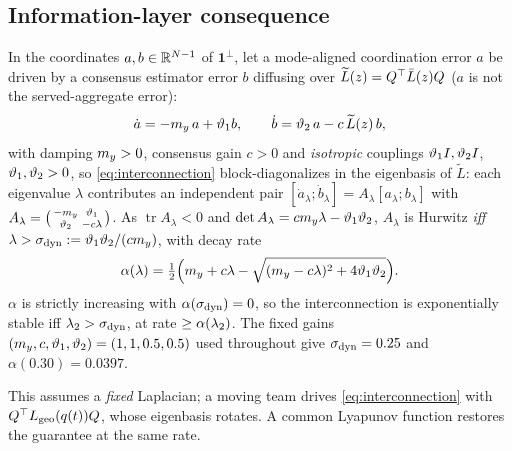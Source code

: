 \subsection{Information-layer consequence}
\begin{proposition}\label{thm:stability}
In the coordinates $a,b\in\mathbb{R}^{N-1}$ of $\mathbf1^{\perp}$, let a mode-aligned coordination
error $a$ be driven by a consensus estimator error $b$ diffusing over
$\widetilde L(z)=Q^{\top}\bar L(z)Q$ ($a$ is not the served-aggregate error):
\begin{equation}
\dot a=-m_y\,a+\vartheta_1 b,\qquad
\dot b=\vartheta_2\,a-c\,\widetilde L(z)\,b,
\label{eq:interconnection}
\end{equation}
with damping $m_y>0$, consensus gain $c>0$ and \emph{isotropic} couplings $\vartheta_1I,\vartheta_2I$,
$\vartheta_1,\vartheta_2>0$, so \eqref{eq:interconnection} block-diagonalizes in the eigenbasis of
$\widetilde L$: each eigenvalue $\lambda$ contributes an independent pair
$[\dot a_\lambda;\dot b_\lambda]=A_\lambda[a_\lambda;b_\lambda]$ with
$A_\lambda=\big(\begin{smallmatrix}-m_y&\vartheta_1\\ \vartheta_2&-c\lambda\end{smallmatrix}\big)$.
As $\operatorname{tr}A_\lambda<0$ and $\det A_\lambda=cm_y\lambda-\vartheta_1\vartheta_2$, $A_\lambda$ is
Hurwitz \emph{iff} $\lambda>\sigma_{\mathrm{dyn}}:=\vartheta_1\vartheta_2/(cm_y)$, with decay rate
\begin{equation}
\alpha(\lambda)=\tfrac12\Big(m_y+c\lambda-
\sqrt{(m_y-c\lambda)^2+4\vartheta_1\vartheta_2}\Big).
\label{eq:rate}
\end{equation}
$\alpha$ is strictly increasing with $\alpha(\sigma_{\mathrm{dyn}})=0$, so the interconnection is
exponentially stable iff $\lambda_2>\sigma_{\mathrm{dyn}}$, at rate $\ge\alpha(\lambda_2)$. The fixed gains
$(m_y,c,\vartheta_1,\vartheta_2)=(1,1,0.5,0.5)$ used throughout give $\sigma_{\mathrm{dyn}}=0.25$ and
$\alpha(0.30)=0.0397$.
\end{proposition}

This assumes a \emph{fixed} Laplacian; a moving team drives \eqref{eq:interconnection} with
$Q^{\top}L_{\mathrm{geo}}(q(t))Q$, whose eigenbasis rotates. A common Lyapunov function restores the
guarantee at the same rate.

